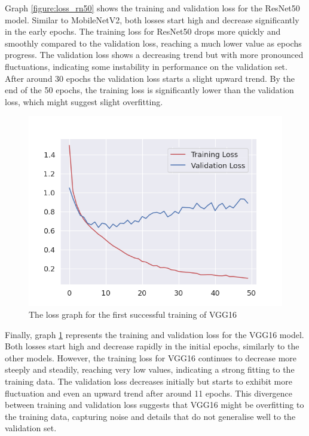 Graph \ref{figure:loss_rn50} shows the training and validation loss for the ResNet50 model. Similar to MobileNetV2, both losses start high and decrease significantly in the early epochs. The training loss for ResNet50 drops more quickly and smoothly compared to the validation loss, reaching a much lower value as epochs progress. The validation loss shows a decreasing trend but with more pronounced fluctuations, indicating some instability in performance on the validation set. After around 30 epochs the validation loss starts a slight upward trend. By the end of the 50 epochs, the training loss is significantly lower than the validation loss, which might suggest slight overfitting.

\begin{figure}[H]
    \centering 
    \includegraphics[scale=0.5]{fed_images/train_loss_VGG16.png}
    \caption{The loss graph for the first successful training of VGG16}
    \label{figure:loss_vgg16}
\end{figure}

Finally, graph \ref{figure:loss_vgg16} represents the training and validation loss for the VGG16 model. Both losses start high and decrease rapidly in the initial epochs, similarly to the other models. However, the training loss for VGG16 continues to decrease more steeply and steadily, reaching very low values, indicating a strong fitting to the training data. The validation loss decreases initially but starts to exhibit more fluctuation and even an upward trend after around 11 epochs. This divergence between training and validation loss suggests that VGG16 might be overfitting to the training data, capturing noise and details that do not generalise well to the validation set.


